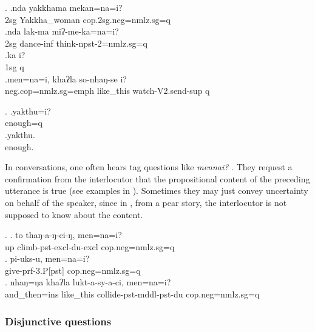  
 \ex. \ag.nda yakkhama              mekan=na=i? \\
 {\sc 2sg} Yakkha\_woman {\sc cop.2sg.neg=nmlz.sg=q}\\
  
 \bg.nda lak-ma miʔ-me-ka=na=i?\\
 {\sc 2sg} dance{\sc -inf} think{\sc -npst-2=nmlz.sg=q}\\
 \bg.ka i?\\
 {\sc 1sg} {\sc q}\\
 \bg.men=na=i,                khaʔla   so-nhaŋ-se               i?\\
 {\sc neg.cop=nmlz.sg=emph} like\_this watch{\sc -V2.send-sup} {\sc q}\\
  
 
 \ex. \ag.yakthu=i?\\
 enough{\sc =q}\\
 \bg.yakthu.\\
 enough.\\
 


In conversations, one often hears tag questions like \emph{mennai?} . They request a confirmation from the interlocutor that the propositional content of the preceding utterance is true (see examples in \Next). Sometimes they may just convey uncertainty on behalf of the speaker, since in \Next[c], from a pear story, the interlocutor is not supposed to know about the content. 
 
\ex. \ag.  to  thaŋ-a-ŋ-ci-ŋ,   men=na=i?\\
up climb{\sc -pst-excl-du-excl}  {\sc cop.neg=nmlz.sg=q}\\
 
\bg. pi-uks-u,            men=na=i?\\
give{\sc -prf-3.P[pst]}  {\sc cop.neg=nmlz.sg=q}\\
 
  \bg.    nhaŋ=ŋa      khaʔla   lukt-a-sy-a-ci,    men=na=i?\\
  and\_then{\sc =ins} like\_this collide{\sc -pst-mddl-pst-du} {\sc cop.neg=nmlz.sg=q} \\
   
  
  
\subsubsection{Disjunctive questions}
 
